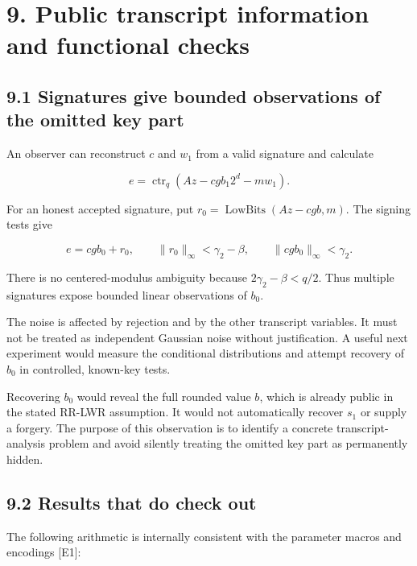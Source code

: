 \documentclass[
  american,
  10pt,
  a4paper,
]{article}
\begin{document}
\section{9. Public transcript information and functional
checks}\label{public-transcript-information-and-functional-checks}

\subsection{9.1 Signatures give bounded observations of the omitted key
part}\label{signatures-give-bounded-observations-of-the-omitted-key-part}

An observer can reconstruct \(c\) and \(w_1\) from a valid signature and
calculate

\[
e=\operatorname{ctr}_q(Az-cgb_1 2^d-mw_1).
\]

For an honest accepted signature, put
\(r_0=\operatorname{LowBits}(Az-cgb,m)\). The signing tests give

\[
e=cgb_0+r_0,\qquad
\|r_0\|_\infty<\gamma_2-\beta,\qquad
\|cgb_0\|_\infty<\gamma_2.
\]

There is no centered-modulus ambiguity because \(2\gamma_2-\beta<q/2\).
Thus multiple signatures expose bounded linear observations of \(b_0\).

The noise is affected by rejection and by the other transcript
variables. It must not be treated as independent Gaussian noise without
justification. A useful next experiment would measure the conditional
distributions and attempt recovery of \(b_0\) in controlled, known-key
tests.

Recovering \(b_0\) would reveal the full rounded value \(b\), which is
already public in the stated RR-LWR assumption. It would not
automatically recover \(s_1\) or supply a forgery. The purpose of this
observation is to identify a concrete transcript-analysis problem and
avoid silently treating the omitted key part as permanently hidden.

\subsection{9.2 Results that do check
out}\label{results-that-do-check-out}

The following arithmetic is internally consistent with the parameter
macros and encodings {[}E1{]}:
\end{document}
